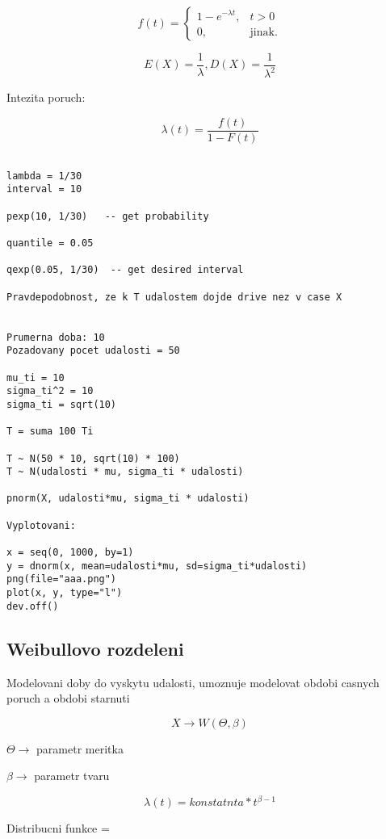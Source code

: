 \documentclass{article}
\begin{document}
\begin{equation}
    f(t)=\begin{cases}
        1 -  e^{-\lambda t}, & t > 0\\
        0, & \text{jinak}.
  \end{cases}
\end{equation}

\[ E(X) = \frac{1}{\lambda}, D(X) = \frac{1}{\lambda^2} \]


Intezita poruch:

\[ \lambda(t) = \frac{f(t)}{1 - F(t)} \]

\begin{verbatim}

lambda = 1/30
interval = 10

pexp(10, 1/30)   -- get probability

quantile = 0.05

qexp(0.05, 1/30)  -- get desired interval

Pravdepodobnost, ze k T udalostem dojde drive nez v case X


Prumerna doba: 10
Pozadovany pocet udalosti = 50

mu_ti = 10
sigma_ti^2 = 10
sigma_ti = sqrt(10)

T = suma 100 Ti

T ~ N(50 * 10, sqrt(10) * 100)
T ~ N(udalosti * mu, sigma_ti * udalosti)

pnorm(X, udalosti*mu, sigma_ti * udalosti)

Vyplotovani:

x = seq(0, 1000, by=1)
y = dnorm(x, mean=udalosti*mu, sd=sigma_ti*udalosti)
png(file="aaa.png")
plot(x, y, type="l")
dev.off()

\end{verbatim}

\subsection{Weibullovo rozdeleni}

Modelovani doby do vyskytu udalosti, umoznuje modelovat obdobi casnych poruch
a obdobi starnuti

\[ X \rightarrow W(\Theta, \beta) \]

$\Theta \rightarrow$ parametr meritka

$\beta \rightarrow$ parametr tvaru

\[ \lambda(t) = konstatnta * t^{\beta - 1} \]

Distribucni funkce = 
\end{document}
